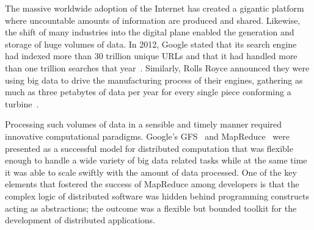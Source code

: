 \label{ch:introduction}





The massive worldwide adoption of the Internet has created a gigantic platform where uncountable amounts of information are produced and shared. Likewise, the shift of many industries into the digital plane enabled the generation and storage of huge volumes of data. In 2012, Google stated that its search engine had indexed more than 30 trillion unique URLs and that it had handled more than one trillion searches that year~\cite{WebGoogleZeitgeist2017}. Similarly, Rolls Royce announced they were using big data to drive the manufacturing process of their engines, gathering as much as three petabytes of data per year for every single piece conforming a turbine~\cite{WebForbes2017,WebRollsRoyce2017}.


Processing such volumes of data in a sensible and timely manner required innovative computational paradigms. Google's GFS~\cite{Ghemawat2003} and MapReduce~\cite{Dean2008} were presented as a successful model for distributed computation that was flexible enough to handle a wide variety of big data related tasks while at the same time it was able to scale swiftly with the amount of data processed. One of the key elements that fostered the success of MapReduce among developers is that the complex logic of distributed software was hidden behind programming constructs acting as abstractions; the outcome was a flexible but bounded toolkit for the development of distributed applications.

